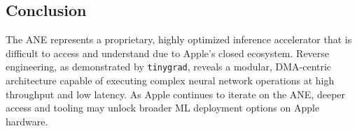 \subsection{Conclusion}

The ANE represents a proprietary, highly optimized inference accelerator that is difficult to access and understand due to Apple’s closed ecosystem. Reverse engineering, as demonstrated by \texttt{tinygrad}, reveals a modular, DMA-centric architecture capable of executing complex neural network operations at high throughput and low latency. As Apple continues to iterate on the ANE, deeper access and tooling may unlock broader ML deployment options on Apple hardware.

